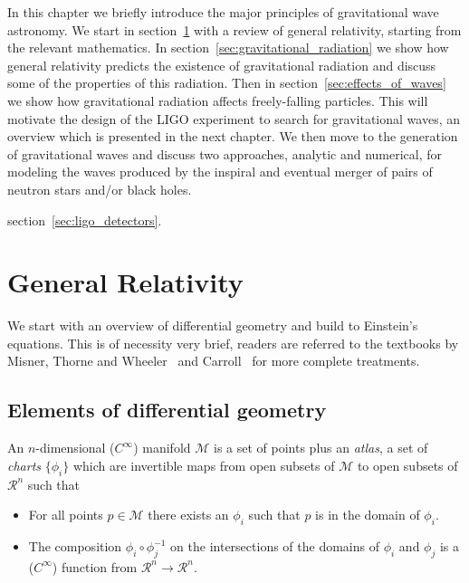In this chapter we briefly introduce the major principles of
gravitational wave astronomy.  We start in
section~\ref{sec:general_relativity} with a review of general
relativity, starting from the relevant mathematics.  In
section~\ref{sec:gravitational_radiation} we show how general
relativity predicts the existence of gravitational radiation and
discuss some of the properties of this radiation.  Then in
section~\ref{sec:effects_of_waves} we show how gravitational radiation
affects freely-falling particles.  This will motivate the design of
the LIGO experiment to search for gravitational waves, an overview 
which is presented in the next chapter.  We then move to the
generation of gravitational waves and discuss two approaches, analytic
and numerical, for modeling the waves produced by the inspiral and
eventual merger of pairs of neutron stars and/or black holes.



section~\ref{sec:ligo_detectors}.

\section{General Relativity}
\label{sec:general_relativity}

We start with an overview of differential geometry and build to
Einstein's equations.  This is of necessity very brief, readers are
referred to the textbooks by Misner, Thorne and Wheeler~\cite{MTW} and
Carroll~\cite{carrollTextbook} for more complete treatments.

\subsection{Elements of differential geometry}

An $n$-dimensional ($C^\infty$) manifold $\mathcal{M}$ is a set of
points plus an \emph{atlas}, a set of \emph{charts} $\{\phi_i\}$ which
are invertible maps from open subsets of $\mathcal{M}$ to open subsets
of $\mathcal{R}^n$ such that


\begin{itemize}
\item For all points $p \in \mathcal{M}$ there exists an $\phi_i$ 
such that $p$ is in the domain of $\phi_i$.
\item The composition $\phi_i \circ \phi_j^{-1}$ on the 
intersections of the domains of $\phi_i$ and $\phi_j$ is a
($C^\infty$) function from $\mathcal{R}^n \to \mathcal{R}^n$.
\end{itemize}

